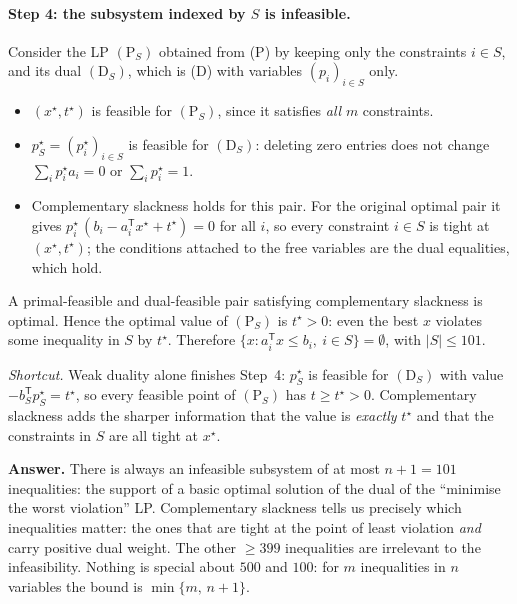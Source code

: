 \documentclass[11pt]{article}
\newcommand{\T}{^{\mathsf T}}
\newcommand{\answer}[1]{\begin{shaded}\noindent\textbf{Answer.} #1\end{shaded}}
\begin{document}
\paragraph{Step 4: the subsystem indexed by $S$ is infeasible.} Consider the LP $(\mathrm P_S)$ obtained from (P) by keeping only the constraints $i\in S$, and its dual $(\mathrm D_S)$, which is (D) with variables $(p_i)_{i\in S}$ only.
\begin{itemize}
\item $(x^\star,t^\star)$ is feasible for $(\mathrm P_S)$, since it satisfies \emph{all} $m$ constraints.
\item $p^\star_S=(p_i^\star)_{i\in S}$ is feasible for $(\mathrm D_S)$: deleting zero entries does not change $\sum_ip_i^\star a_i=0$ or $\sum_ip_i^\star=1$.
\item Complementary slackness holds for this pair. For the original optimal pair it gives $p_i^\star\,(b_i-a_i\T x^\star+t^\star)=0$ for all $i$, so every constraint $i\in S$ is tight at $(x^\star,t^\star)$; the conditions attached to the free variables are the dual equalities, which hold.
\end{itemize}
A primal-feasible and dual-feasible pair satisfying complementary slackness is optimal. Hence the optimal value of $(\mathrm P_S)$ is $t^\star>0$: even the best $x$ violates some inequality in $S$ by $t^\star$. Therefore $\{x:a_i\T x\le b_i,\ i\in S\}=\emptyset$, with $|S|\le101$.

\emph{Shortcut.} Weak duality alone finishes Step~4: $p^\star_S$ is feasible for $(\mathrm D_S)$ with value $-b_S\T p_S^\star=t^\star$, so every feasible point of $(\mathrm P_S)$ has $t\ge t^\star>0$. Complementary slackness adds the sharper information that the value is \emph{exactly} $t^\star$ and that the constraints in $S$ are all tight at $x^\star$.

\answer{There is always an infeasible subsystem of at most $n+1=101$ inequalities: the support of a basic optimal solution of the dual of the ``minimise the worst violation'' LP. Complementary slackness tells us precisely which inequalities matter: the ones that are tight at the point of least violation \emph{and} carry positive dual weight. The other $\ge399$ inequalities are irrelevant to the infeasibility. Nothing is special about $500$ and $100$: for $m$ inequalities in $n$ variables the bound is $\min\{m,\,n+1\}$.}
\end{document}

